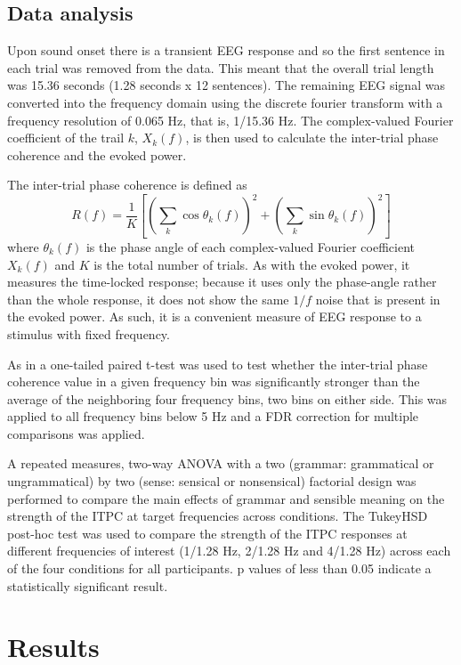 \documentclass[a4paper,10pt,twoside]{article}
\begin{document}
\subsection*{Data analysis}

Upon sound onset there is a transient EEG response and
so the first sentence in each trial was removed from the data. This
meant that the overall trial length was 15.36 seconds (1.28 seconds x
12 sentences). The remaining EEG signal was converted into the frequency domain using the discrete
fourier transform with a frequency resolution of 0.065 Hz, that is, 1/15.36 Hz. The complex-valued Fourier coefficient of the trail $k$, $X_k(f)$, is then used to calculate the inter-trial phase coherence and the evoked power. 

The inter-trial phase coherence is defined as
\begin{equation}
\label{eq:itpc}
R(f)=\frac{1}{K}\left[\left(\sum_k{\cos{\theta_k(f)}}\right)^2+\left(\sum_k{\sin{\theta_k(f)}}\right)^2\right]
\end{equation}
where $\theta_k(f)$ is the phase angle of each complex-valued Fourier coefficient $X_k(f)$ and $K$ is the total number of trials. As with the evoked power, it measures the time-locked response; because it uses only the phase-angle rather than the whole response, it does not show the same $1/f$ noise that is present in the evoked power. As such, it is a convenient measure of EEG response to a stimulus with fixed frequency.

As in \cite{DingEtAl2016} a one-tailed paired t-test was used to test whether the inter-trial phase coherence value in a given frequency bin was significantly stronger than the average of the neighboring four frequency bins, two bins on either side. This was applied to all frequency bins below 5 Hz and a FDR correction for multiple comparisons was applied. 

A repeated measures, two-way ANOVA with a two (grammar: grammatical or ungrammatical) by two (sense: sensical or nonsensical) factorial design was performed to compare the main effects of grammar and sensible meaning on the strength of the ITPC at target frequencies across conditions. The TukeyHSD post-hoc test was used to compare the strength of the ITPC responses at different frequencies of interest (1/1.28 Hz, 2/1.28 Hz and 4/1.28 Hz) across each of the four conditions for all participants. p values of less than 0.05 indicate a statistically significant result.


\section*{Results}
\end{document}
